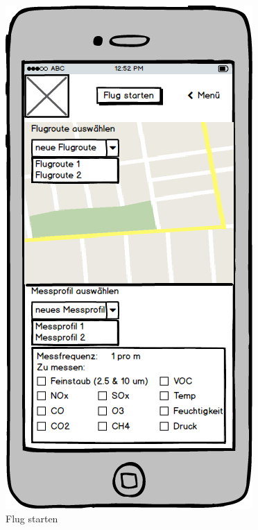 \begin{figure}
	\centering
	\includegraphics[scale=0.8]{images/FlugStarten}
	\caption{Flug starten}
\end{figure}
\newpage

